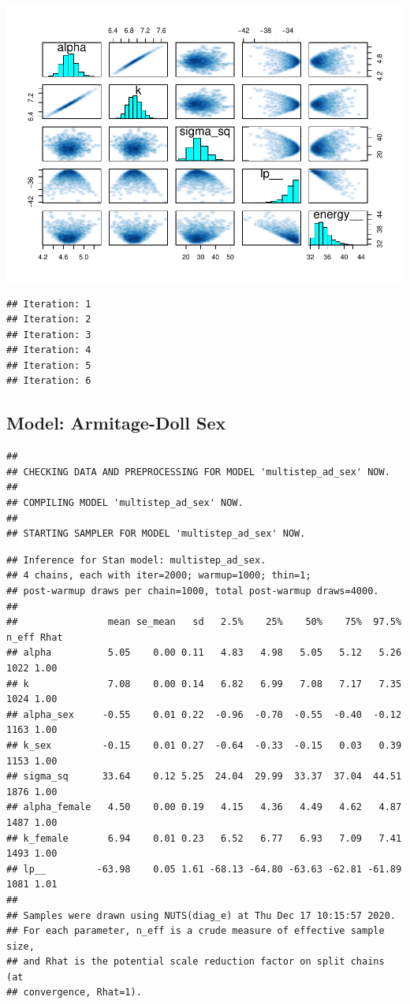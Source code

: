 \documentclass[
]{article}
\begin{document}
\includegraphics{multistep-model-comparison_files/figure-latex/model_ad-1.pdf}

\begin{verbatim}
## Iteration: 1
## Iteration: 2
## Iteration: 3
## Iteration: 4
## Iteration: 5
## Iteration: 6
\end{verbatim}

\hypertarget{model-armitage-doll-sex}{%
\subsection{Model: Armitage-Doll Sex}\label{model-armitage-doll-sex}}

\begin{verbatim}
## 
## CHECKING DATA AND PREPROCESSING FOR MODEL 'multistep_ad_sex' NOW.
## 
## COMPILING MODEL 'multistep_ad_sex' NOW.
## 
## STARTING SAMPLER FOR MODEL 'multistep_ad_sex' NOW.
\end{verbatim}

\begin{verbatim}
## Inference for Stan model: multistep_ad_sex.
## 4 chains, each with iter=2000; warmup=1000; thin=1; 
## post-warmup draws per chain=1000, total post-warmup draws=4000.
## 
##                mean se_mean   sd   2.5%    25%    50%    75%  97.5% n_eff Rhat
## alpha          5.05    0.00 0.11   4.83   4.98   5.05   5.12   5.26  1022 1.00
## k              7.08    0.00 0.14   6.82   6.99   7.08   7.17   7.35  1024 1.00
## alpha_sex     -0.55    0.01 0.22  -0.96  -0.70  -0.55  -0.40  -0.12  1163 1.00
## k_sex         -0.15    0.01 0.27  -0.64  -0.33  -0.15   0.03   0.39  1153 1.00
## sigma_sq      33.64    0.12 5.25  24.04  29.99  33.37  37.04  44.51  1876 1.00
## alpha_female   4.50    0.00 0.19   4.15   4.36   4.49   4.62   4.87  1487 1.00
## k_female       6.94    0.01 0.23   6.52   6.77   6.93   7.09   7.41  1493 1.00
## lp__         -63.98    0.05 1.61 -68.13 -64.80 -63.63 -62.81 -61.89  1081 1.01
## 
## Samples were drawn using NUTS(diag_e) at Thu Dec 17 10:15:57 2020.
## For each parameter, n_eff is a crude measure of effective sample size,
## and Rhat is the potential scale reduction factor on split chains (at 
## convergence, Rhat=1).
\end{verbatim}
\end{document}
